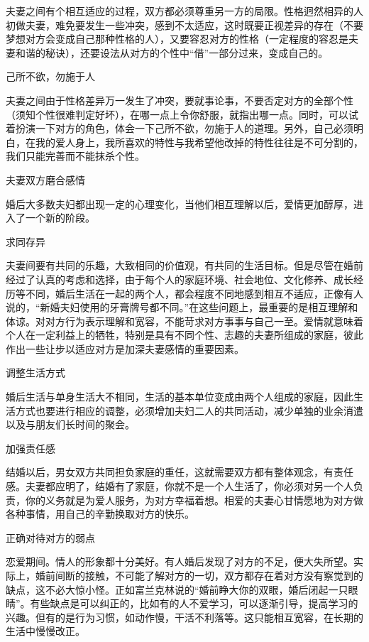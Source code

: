 \documentclass[12pt,UTF8]{ctexbook}
\begin{document}
夫妻之间有个相互适应的过程，双方都必须尊重另一方的局限。性格迥然相异的人初做夫妻，难免要发生一些冲突，感到不太适应，这时既要正视差异的存在（不要梦想对方会变成自己那种性格的人），又要容忍对方的性格（一定程度的容忍是夫妻和谐的秘诀），还要设法从对方的个性中“借”一部分过来，变成自己的。





己所不欲，勿施于人


夫妻之间由于性格差异万一发生了冲突，要就事论事，不要否定对方的全部个性（须知个性很难判定好坏），在哪一点上令你舒服，就指出哪一点。同时，可以试着扮演一下对方的角色，体会一下己所不欲，勿施于人的道理。另外，自己必须明白，在我的爱人身上，我所喜欢的特性与我希望他改掉的特性往往是不可分割的，我们只能完善而不能抹杀个性。





夫妻双方磨合感情


婚后大多数夫妇都出现一定的心理变化，当他们相互理解以后，爱情更加醇厚，进入了一个新的阶段。

求同存异

夫妻间要有共同的乐趣，大致相同的价值观，有共同的生活目标。但是尽管在婚前经过了认真的考虑和选择，由于每个人的家庭环境、社会地位、文化修养、成长经历等不同，婚后生活在一起的两个人，都会程度不同地感到相互不适应，正像有人说的，“新婚夫妇使用的牙膏牌号都不同。”在这些问题上，最重要的是相互理解和体谅。对对方行为表示理解和宽容，不能苛求对方事事与自己一至。爱情就意味着个人在一定利益上的牺牲，特别是具有不同个性、志趣的夫妻所组成的家庭，彼此作出一些让步以适应对方是加深夫妻感情的重要因素。

调整生活方式

婚后生活与单身生活大不相同，生活的基本单位变成由两个人组成的家庭，因此生活方式也要进行相应的调整，必须增加夫妇二人的共同活动，减少单独的业余消遣以及与朋友们长时间的聚会。

加强责任感

结婚以后，男女双方共同担负家庭的重任，这就需要双方都有整体观念，有责任感。夫妻都应明了，结婚有了家庭，你就不是一个人生活了，你必须对另一个人负责，你的义务就是为爱人服务，为对方幸福着想。相爱的夫妻心甘情愿地为对方做各种事情，用自己的辛勤换取对方的快乐。

正确对待对方的弱点

恋爱期间。情人的形象都十分美好。有人婚后发现了对方的不足，便大失所望。实际上，婚前间断的接触，不可能了解对方的一切，双方都存在着对方没有察觉到的缺点，这不必大惊小怪。正如富兰克林说的“婚前睁大你的双眼，婚后闭起一只眼睛”。有些缺点是可以纠正的，比如有的人不爱学习，可以逐渐引导，提高学习的兴趣。但有的是行为习惯，如动作慢，干活不利落等。这只能相互宽容，在长期的生活中慢慢改正。
\end{document}
